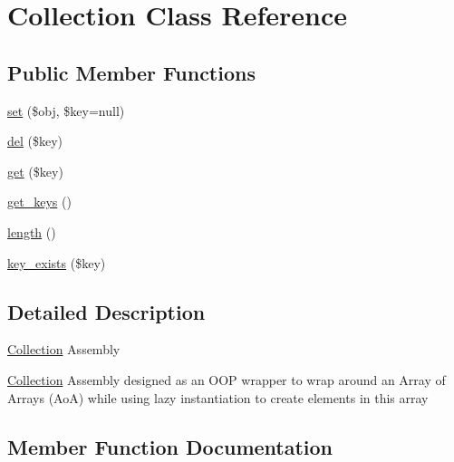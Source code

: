 \hypertarget{class_w_a_f_f_l_e_1_1_framework_1_1_assembly_1_1_collection}{}\section{Collection Class Reference}
\label{class_w_a_f_f_l_e_1_1_framework_1_1_assembly_1_1_collection}
\subsection*{Public Member Functions}
\begin{DoxyCompactItemize}
\item 
\hyperlink{class_w_a_f_f_l_e_1_1_framework_1_1_assembly_1_1_collection_a5a9a5feec04bd1260cc7c878b365e38e}{set} (\$obj, \$key=null)
\item 
\hyperlink{class_w_a_f_f_l_e_1_1_framework_1_1_assembly_1_1_collection_a4be48cfb26bfde30df2a0954ee852591}{del} (\$key)
\item 
\hyperlink{class_w_a_f_f_l_e_1_1_framework_1_1_assembly_1_1_collection_a24a9bf83a1002d46ece83a93d14bd921}{get} (\$key)
\item 
\hyperlink{class_w_a_f_f_l_e_1_1_framework_1_1_assembly_1_1_collection_a72540410e5d139cfba23a4f39ecc32be}{get\+\_\+keys} ()
\item 
\hyperlink{class_w_a_f_f_l_e_1_1_framework_1_1_assembly_1_1_collection_a5facb816a7ce2173a30db9b0bc8ecf75}{length} ()
\item 
\hyperlink{class_w_a_f_f_l_e_1_1_framework_1_1_assembly_1_1_collection_a9fd43b991d5a266daff254f49c24bf8e}{key\+\_\+exists} (\$key)
\end{DoxyCompactItemize}


\subsection{Detailed Description}
\hyperlink{class_w_a_f_f_l_e_1_1_framework_1_1_assembly_1_1_collection}{Collection} Assembly

\hyperlink{class_w_a_f_f_l_e_1_1_framework_1_1_assembly_1_1_collection}{Collection} Assembly designed as an O\+OP wrapper to wrap around an Array of Arrays (AoA) while using lazy instantiation to create elements in this array 

\subsection{Member Function Documentation}
\mbox{\label{class_w_a_f_f_l_e_1_1_framework_1_1_assembly_1_1_collection_a4be48cfb26bfde30df2a0954ee852591}} 
